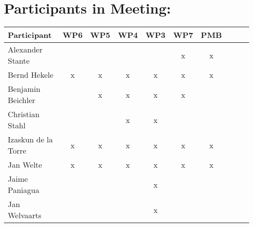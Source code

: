 \documentclass[a4paper, 11pt]{article}
\begin{document}
\section{Participants in Meeting:}

\begin{tabular}{|l|c|c|c||c|c|c||c|c|c|}
\hline
\textbf{Participant} & \textbf{WP6} &  \textbf{WP5} & \textbf{WP4}&  \textbf{WP3} & \textbf{WP7}&  \textbf{PMB} \\\hline
Alexander Stante     &   &   &   &   & x & x \\\hline 
Bernd Hekele         & x & x & x & x & x & x \\\hline
Benjamin Beichler    &   & x & x & x & x &   \\\hline
Christian Stahl      &   &   & x & x &   &   \\\hline
Izaskun de la Torre  & x & x & x & x & x & x \\\hline
Jan Welte            & x & x & x & x & x & x \\\hline
Jaime Paniagua       &   &   &   & x &   &   \\\hline
Jan Welvaarts        &   &   &   & x &   &   \\\hline

\end{tabular}
\end{document}
